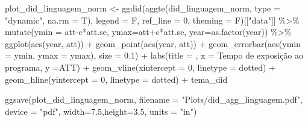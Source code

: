 \documentclass[
  letterpaper,
  DIV=11,
  numbers=noendperiod]{scrartcl}
\newenvironment{Shaded}{\begin{snugshade}}{\end{snugshade}}
\newcommand{\AttributeTok}[1]{\textcolor[rgb]{0.40,0.45,0.13}{#1}}
\newcommand{\DecValTok}[1]{\textcolor[rgb]{0.68,0.00,0.00}{#1}}
\newcommand{\FloatTok}[1]{\textcolor[rgb]{0.68,0.00,0.00}{#1}}
\newcommand{\FunctionTok}[1]{\textcolor[rgb]{0.28,0.35,0.67}{#1}}
\newcommand{\NormalTok}[1]{\textcolor[rgb]{0.00,0.23,0.31}{#1}}
\newcommand{\OtherTok}[1]{\textcolor[rgb]{0.00,0.23,0.31}{#1}}
\newcommand{\SpecialCharTok}[1]{\textcolor[rgb]{0.37,0.37,0.37}{#1}}
\newcommand{\StringTok}[1]{\textcolor[rgb]{0.13,0.47,0.30}{#1}}
\begin{document}
\begin{Shaded}
\begin{Highlighting}[]
\NormalTok{plot\_did\_linguagem\_norm }\OtherTok{\textless{}{-}}
\FunctionTok{ggdid}\NormalTok{(}\FunctionTok{aggte}\NormalTok{(did\_linguagem\_norm, }\AttributeTok{type =} \StringTok{"dynamic"}\NormalTok{, }\AttributeTok{na.rm =}\NormalTok{ T),       }
      \AttributeTok{legend =}\NormalTok{ F, }\AttributeTok{ref\_line =} \DecValTok{0}\NormalTok{, }\AttributeTok{theming =}\NormalTok{ F)[[}\StringTok{"data"}\NormalTok{]] }\SpecialCharTok{\%\textgreater{}\%} 
    \FunctionTok{mutate}\NormalTok{(}\AttributeTok{ymin =}\NormalTok{ att}\SpecialCharTok{{-}}\NormalTok{c}\SpecialCharTok{*}\NormalTok{att.se, }\AttributeTok{ymax=}\NormalTok{att}\SpecialCharTok{+}\NormalTok{c}\SpecialCharTok{*}\NormalTok{att.se, }\AttributeTok{year=}\FunctionTok{as.factor}\NormalTok{(year)) }\SpecialCharTok{\%\textgreater{}\%} 
    \FunctionTok{ggplot}\NormalTok{(}\FunctionTok{aes}\NormalTok{(year, att)) }\SpecialCharTok{+}
    \FunctionTok{geom\_point}\NormalTok{(}\FunctionTok{aes}\NormalTok{(year, att)) }\SpecialCharTok{+}
    \FunctionTok{geom\_errorbar}\NormalTok{(}\FunctionTok{aes}\NormalTok{(}\AttributeTok{ymin =}\NormalTok{ ymin, }\AttributeTok{ymax =}\NormalTok{ ymax), }\AttributeTok{size =} \FloatTok{0.1}\NormalTok{) }\SpecialCharTok{+}
    \FunctionTok{labs}\NormalTok{(}\AttributeTok{title =} \StringTok{\textquotesingle{}\textquotesingle{}}\NormalTok{,}
         \AttributeTok{x =} \StringTok{\textquotesingle{}Tempo de exposição ao programa\textquotesingle{}}\NormalTok{,}
         \AttributeTok{y =}\StringTok{\textquotesingle{}ATT\textquotesingle{}}\NormalTok{) }\SpecialCharTok{+}
    \FunctionTok{geom\_vline}\NormalTok{(}\AttributeTok{xintercept =} \StringTok{\textquotesingle{}0\textquotesingle{}}\NormalTok{, }\AttributeTok{linetype =} \StringTok{\textquotesingle{}dotted\textquotesingle{}}\NormalTok{) }\SpecialCharTok{+}
    \FunctionTok{geom\_hline}\NormalTok{(}\AttributeTok{yintercept =} \DecValTok{0}\NormalTok{, }\AttributeTok{linetype =} \StringTok{\textquotesingle{}dotted\textquotesingle{}}\NormalTok{) }\SpecialCharTok{+}
\NormalTok{    tema\_did}

\FunctionTok{ggsave}\NormalTok{(plot\_did\_linguagem\_norm, }
       \AttributeTok{filename =} \StringTok{"Plots/did\_agg\_linguagem.pdf"}\NormalTok{,}
       \AttributeTok{device =} \StringTok{"pdf"}\NormalTok{,}
       \AttributeTok{width=}\FloatTok{7.5}\NormalTok{,}\AttributeTok{height=}\FloatTok{3.5}\NormalTok{, }\AttributeTok{units =} \StringTok{"in"}\NormalTok{)}


\end{Highlighting}
\end{Shaded}
\end{document}
